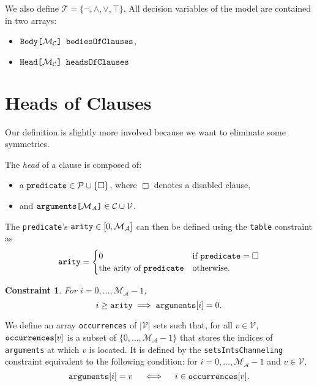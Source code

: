 \documentclass[runningheads]{llncs}
\newtheorem{constraint}{Constraint}
\newcommand{\variable}[1]{\texttt{\textup{#1}}}
\newcommand{\arrayd}[3]{\variable{{#1}[}{#2}\variable{]} \in {#3}}
\newcommand{\arrayt}[3]{\variable{{#3}[}{#2}\variable{] {#1}}}
\newcommand{\predicates}{\mathcal{P}}
\newcommand{\variables}{\mathcal{V}}
\newcommand{\constants}{\mathcal{C}}
\newcommand{\tokens}{\mathcal{T}}
\newcommand{\maxArity}{\mathcal{M}_{\mathcal{A}}}
\newcommand{\maxNumClauses}{\mathcal{M}_{\mathcal{C}}}
\begin{document}
We also define $\tokens{} = \{ \neg, \land, \lor, \top \}$. All decision
variables of the model are contained in two arrays:
\begin{itemize}
\item $\arrayt{bodiesOfClauses}{\maxNumClauses{}}{Body}$,
\item $\arrayt{headsOfClauses}{\maxNumClauses{}}{Head}$
\end{itemize}

\section{Heads of Clauses}

Our definition is slightly more involved because we want to eliminate some
symmetries.

\begin{definition}
  The \emph{head} of a clause is composed of:
  \begin{itemize}
  \item a $\variable{predicate} \in \predicates \cup \{ \Box \}$, where $\Box$
    denotes a disabled clause,
  \item and $\arrayd{arguments}{\maxArity{}}{\constants{} \cup \variables{}}$.
  \end{itemize}
\end{definition}

\begin{definition}
  The \variable{predicate}'s $\variable{arity} \in [0, \maxArity{}]$ can then be
  defined using the \variable{table} constraint as
  \[
    \variable{arity} = \begin{cases}
      0 & \text{if } \variable{predicate} = \Box\\
      \text{the arity of } \variable{predicate} & \text{otherwise.}
    \end{cases}
  \]
\end{definition}

\begin{constraint}
  For $i = 0, \dots, \maxArity{} - 1$,
  \[
    i \ge \variable{arity} \implies \variable{arguments}[i] = 0.
  \]
\end{constraint}

\begin{definition} We define an array \variable{occurrences} of $|\variables{}|$
  sets such that, for all $v \in \variables{}$, $\variable{occurrences}[v]$ is a
  subset of $\{ 0, \dots, \maxArity{} - 1\}$ that stores the indices of
  \variable{arguments} at which $v$ is located. It is defined by the
  \variable{setsIntsChanneling} constraint equivalent to the following
  condition: for $i = 0, \dots, \maxArity{} - 1$ and $v \in \variables{}$,
  \[
    \variable{arguments}[i] = v \quad \iff \quad i \in \variable{occurrences}[v].
  \]
\end{definition}
\end{document}
